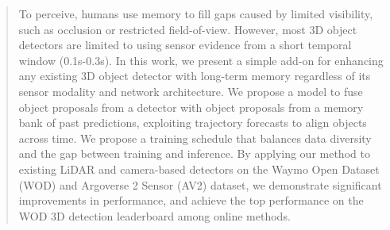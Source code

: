 \begin{abstract}
To perceive, humans use memory to fill gaps caused by limited visibility, such as occlusion or restricted field-of-view. However, most 3D object detectors are limited to using sensor evidence from a short temporal window (0.1s-0.3s). In this work, we present a simple add-on for enhancing any existing 3D object detector with long-term memory regardless of its sensor modality and network architecture. We propose a model to fuse object proposals from a detector with object proposals from a memory bank of past predictions, exploiting trajectory forecasts to align objects across time. We propose a training schedule that balances data diversity and the gap between training and inference. By applying our method to existing LiDAR and camera-based detectors on the Waymo Open Dataset (WOD) and Argoverse 2 Sensor (AV2) dataset, we demonstrate significant improvements in performance, and achieve the top performance on the WOD 3D detection leaderboard among online methods.
\end{abstract}